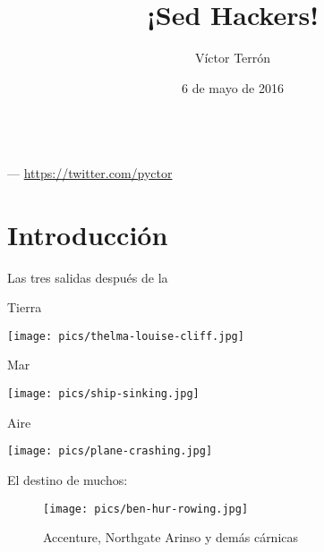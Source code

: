 \documentclass[14pt]{beamer}
\title{¡Sed Hackers!}
\author{Víctor Terrón}
\date{6 de mayo de 2016}
\institute{@pyctor}
\begin{document}
{

\begin{frame}[plain]
  \vspace{6.25cm}
  \begin{TitleBox}
    {\LARGE \inserttitle} \\
    {\small \insertauthor \enspace --- \thinspace \url{https://twitter.com/pyctor}}
  \end{TitleBox}
\end{frame}
}

\section{Introducción}
\begin{frame}{}
\begin{block}{}
    \centering \Large Las tres salidas después de la 
\end{block}
\end{frame}

\begin{frame}{Tierra}
  \begin{center}
    \texttt{[image: pics/thelma-louise-cliff.jpg]}
  \end{center}
\end{frame}

\begin{frame}{Mar}
  \begin{center}
    \texttt{[image: pics/ship-sinking.jpg]}
  \end{center}
\end{frame}

\begin{frame}{Aire}
  \begin{center}
    \texttt{[image: pics/plane-crashing.jpg]}
  \end{center}
\end{frame}

\begin{frame}{}
\begin{block}{}
    \centering \Large El destino de muchos: 
\end{block}
\begin{figure}
  \centering
  \texttt{[image: pics/ben-hur-rowing.jpg]}
  \caption*{Accenture, Northgate Arinso y demás cárnicas}
\end{figure}
\end{frame}
\end{document}
